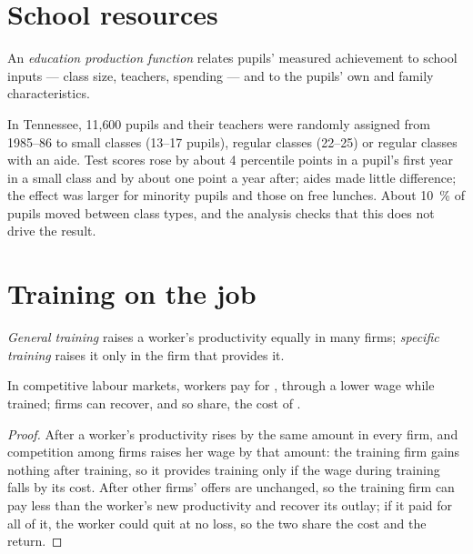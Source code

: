 \section{School resources}\label{sec:b3:human-capital:resources}

\begin{definition}\label{def:b3:human-capital:education-production}
An \emph{education production function} relates pupils' measured achievement to
school inputs --- class size, teachers, spending --- and to the pupils' own and family
characteristics.
\end{definition}

\begin{record}
In Tennessee, 11{,}600 pupils and their teachers were randomly assigned from 1985--86
to small classes (13--17 pupils), regular classes (22--25) or regular classes with an
aide. Test scores rose by about 4 percentile points in a pupil's first year in a small
class and by about one point a year after; aides made little difference; the
effect was larger for minority pupils and those on free lunches. About 10~\% of pupils
moved between class types, and the analysis checks that this does not drive the
result. %
\end{record}

\section{Training on the job}\label{sec:b3:human-capital:training}

\begin{definition}\label{def:b3:human-capital:training}
\emph{General training} raises a worker's productivity equally in many firms;
\emph{specific training} raises it only in the firm that provides it.
\end{definition}

\begin{proposition}\label{prop:b3:human-capital:becker}
In competitive labour markets, workers pay for , through a lower
wage while trained; firms can recover, and so share, the cost of .
\end{proposition}

\begin{proof}
After  a worker's productivity rises by the same amount in every
firm, and competition among firms raises her wage by that amount: the training firm
gains nothing after training, so it provides training only if the wage during
training falls by its cost. After  other firms' offers are
unchanged, so the training firm can pay less than the worker's new productivity
and recover its outlay; if it paid for all of it, the worker could quit at no loss,
so the two share the cost and the return.
\end{proof}

